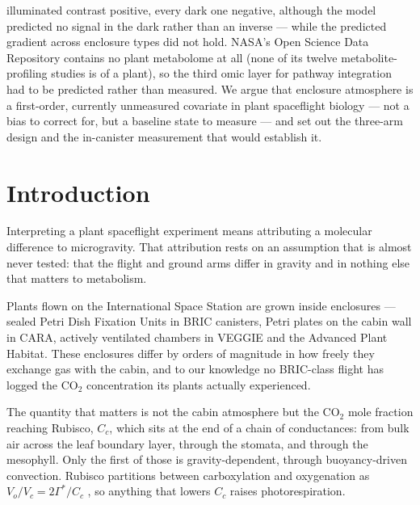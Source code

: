 \documentclass[pdflatex,sn-nature]{sn-jnl}
\begin{document}
{illuminated contrast positive, every dark one negative, although the model predicted no
signal in the dark rather than an inverse --- while the predicted gradient across enclosure
types did not hold. NASA's Open Science Data Repository contains no plant metabolome at all
(none of its twelve metabolite-profiling studies is of a plant), so the third omic
layer for pathway integration had to be predicted rather than measured. We argue that
enclosure atmosphere is a first-order, currently unmeasured covariate in plant spaceflight
biology --- not a bias to correct for, but a baseline state to measure --- and set out the
three-arm design and the in-canister measurement that would establish it.}


\maketitle

\section{Introduction}\label{sec:intro}

Interpreting a plant spaceflight experiment means attributing a molecular difference to
microgravity. That attribution rests on an assumption that is almost never tested: that the
flight and ground arms differ in gravity and in nothing else that matters to metabolism.

Plants flown on the International Space Station are grown inside enclosures --- sealed
Petri Dish Fixation Units in BRIC canisters, Petri plates on the cabin wall in CARA, actively
ventilated chambers in VEGGIE and the Advanced Plant Habitat. These enclosures differ by
orders of magnitude in how freely they exchange gas with the cabin, and to our knowledge no
BRIC-class flight has logged the CO$_2$ concentration its plants actually experienced.

The quantity that matters is not the cabin atmosphere but the CO$_2$ mole fraction reaching
Rubisco, $C_c$, which sits at the end of a chain of conductances: from bulk air across the
leaf boundary layer, through the stomata, and through the mesophyll. Only the first of those
is gravity-dependent, through buoyancy-driven convection. Rubisco partitions between
carboxylation and oxygenation as $V_o/V_c = 2\Gamma^*/C_c$ \citep{farquhar1980}, so anything
that lowers $C_c$ raises photorespiration.
\end{document}
